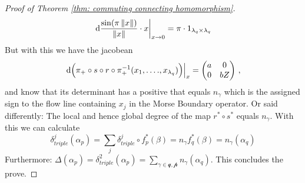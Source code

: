 \begin{proof}[Proof of Theorem \ref{thm: commuting connecting homomorphism}]
		\begin{equation*}
			\left.\mathop{}\!\mathrm{d} \frac{\sin(\pi\left\lVert x\right\rVert)}{\left\lVert x\right\rVert}\cdot x\right|_{x\to 0}=\pi\cdot 1_{\lambda_q\times \lambda_q}
		\end{equation*} But with this we have the jacobean 
		\begin{equation*}
			\left.\mathop{}\!\mathrm{d} \Big( \pi_+\circ s\circ r\circ \pi_+^{-1}(x_1,\dots .,x_{\lambda_q})\Big)\right|_{x}=\begin{pmatrix}
				a&0\\
				0&bZ
			\end{pmatrix}\,,
		\end{equation*} and know that its determinant has a positive that equals $n_{\gamma}$ which is the assigned sign to the flow line containing $x_j$ in the Morse Boundary operator. Or said differently: The local and hence global degree of the map $r^*\circ s^*$ equals $n_\gamma$. With this we can calculate 
		\begin{equation*}
			\delta^j_{triple}(\alpha_p)=\sum_{j}\delta^j_{triple}\circ f_p^*(\beta)=n_{\gamma}f^*_q(\beta)=n_\gamma(\alpha_q)
		\end{equation*}
		Furthermore: $\Delta(\alpha_p)=\delta^2_{triple}(\alpha_p)=\sum_{\gamma \in \mathcal{q,p}} n_\gamma(\alpha_q)$. This concludes the prove. 
	\end{proof}